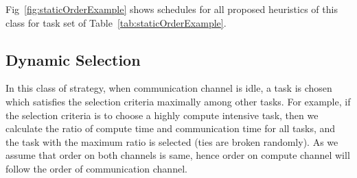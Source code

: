 \documentclass[runningheads]{llncs} %
\begin{document}

Fig~\ref{fig:staticOrderExample} shows schedules for all proposed heuristics of this class for task set of Table~\ref{tab:staticOrderExample}.
\subsection{Dynamic Selection}

In this class of strategy, when communication channel is idle, a task is chosen which satisfies the selection criteria maximally among other tasks. For example, if the selection criteria is to choose a highly compute intensive task, then  we calculate the ratio of compute time and communication time for all tasks, and the task with the  maximum ratio is selected (ties are broken randomly). As we assume that order on both channels is same, hence order on compute channel will follow the order of communication channel.
\end{document}
